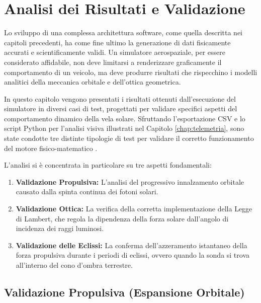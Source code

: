 \chapter{Analisi dei Risultati e Validazione}
\label{chap:risultati}

Lo sviluppo di una complessa architettura software, come quella descritta nei capitoli precedenti, ha come fine ultimo la generazione di dati fisicamente accurati e scientificamente validi. Un simulatore aerospaziale, per essere considerato affidabile, non deve limitarsi a renderizzare graficamente il comportamento di un veicolo, ma deve produrre risultati che rispecchino i modelli analitici della meccanica orbitale e dell'ottica geometrica.

In questo capitolo vengono presentati i risultati ottenuti dall'esecuzione del simulatore in diversi casi di test, progettati per validare specifici aspetti del comportamento dinamico della vela solare. Sfruttando l'esportazione CSV e lo script Python per l'analisi visiva illustrati nel Capitolo \ref{chap:telemetria}, sono state condotte tre distinte tipologie di test per validare il corretto funzionamento del motore fisico-matematico \cite{mcinnes1999solar, simo2016realistic}. 

L'analisi si è concentrata in particolare su tre aspetti fondamentali:
\begin{enumerate}
    \item \textbf{Validazione Propulsiva:} L'analisi del progressivo innalzamento orbitale causato dalla spinta continua dei fotoni solari.
    \item \textbf{Validazione Ottica:} La verifica della corretta implementazione della Legge di Lambert, che regola la dipendenza della forza solare dall'angolo di incidenza dei raggi luminosi.
    \item \textbf{Validazione delle Eclissi:} La conferma dell'azzeramento istantaneo della forza propulsiva durante i periodi di eclissi, ovvero quando la sonda si trova all'interno del cono d'ombra terrestre.
\end{enumerate}


\section{Validazione Propulsiva (Espansione Orbitale)}


